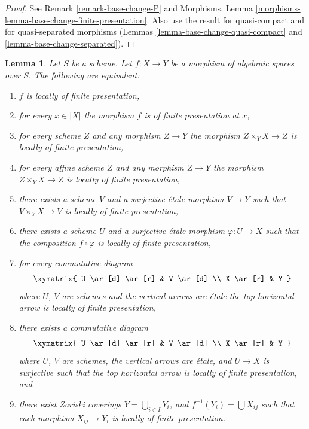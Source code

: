 \documentclass{stacks-project}
\theoremstyle{plain}
\newtheorem{lemma}[subsection]{Lemma}
\theoremstyle{definition}
\theoremstyle{remark}
\numberwithin{equation}{subsection}
\begin{document}
\begin{proof}
See Remark \ref{remark-base-change-P} and
Morphisms, Lemma \ref{morphisms-lemma-base-change-finite-presentation}.
Also use the result for quasi-compact and for quasi-separated morphisms
(Lemmas \ref{lemma-base-change-quasi-compact} and
\ref{lemma-base-change-separated}).
\end{proof}

\begin{lemma}
\label{lemma-finite-presentation-local}
Let $S$ be a scheme.
Let $f : X \to Y$ be a morphism of algebraic spaces over $S$.
The following are equivalent:
\begin{enumerate}
\item $f$ is locally of finite presentation,
\item for every $x \in |X|$ the morphism $f$ is of finite presentation at $x$,
\item for every scheme $Z$ and any morphism $Z \to Y$ the morphism
$Z \times_Y X \to Z$ is locally of finite presentation,
\item for every affine scheme $Z$ and any morphism
$Z \to Y$ the morphism $Z \times_Y X \to Z$ is locally of finite presentation,
\item there exists a scheme $V$ and a surjective \'etale morphism
$V \to Y$ such that $V \times_Y X \to V$ is
locally of finite presentation,
\item there exists a scheme $U$ and a surjective \'etale morphism
$\varphi : U \to X$ such that the composition $f \circ \varphi$
is locally of finite presentation,
\item for every commutative diagram
$$
\xymatrix{
U \ar[d] \ar[r] & V \ar[d] \\
X \ar[r] & Y
}
$$
where $U$, $V$ are schemes and the vertical arrows are \'etale
the top horizontal arrow is locally of finite presentation,
\item there exists a commutative diagram
$$
\xymatrix{
U \ar[d] \ar[r] & V \ar[d] \\
X \ar[r] & Y
}
$$
where $U$, $V$ are schemes, the vertical arrows are \'etale, and
$U \to X$ is surjective such that the top horizontal arrow is
locally of finite presentation, and
\item there exist Zariski coverings $Y = \bigcup_{i \in I} Y_i$,
and $f^{-1}(Y_i) = \bigcup X_{ij}$ such that
each morphism $X_{ij} \to Y_i$ is locally of finite presentation.
\end{enumerate}
\end{lemma}
\end{document}

